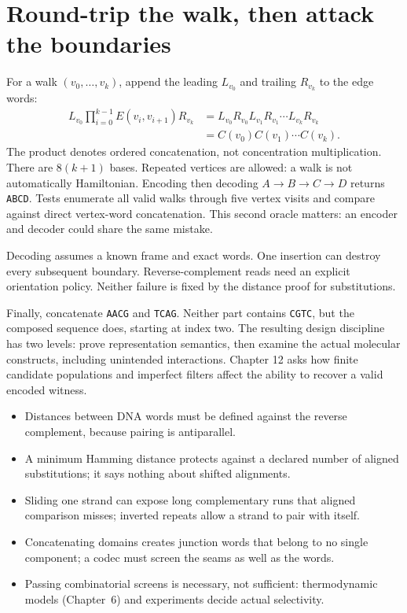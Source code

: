 \section{Round-trip the walk, then attack the boundaries}
For a walk $(v_0,\ldots,v_k)$, append the leading $L_{v_0}$ and trailing
$R_{v_k}$ to the edge words:
\begin{align}
 L_{v_0}\prod_{i=0}^{k-1}E(v_i,v_{i+1})R_{v_k}
 &=L_{v_0}R_{v_0}L_{v_1}R_{v_1}\cdots L_{v_k}R_{v_k}\\
 &=C(v_0)C(v_1)\cdots C(v_k).
\end{align}
The product denotes ordered concatenation, not concentration multiplication.
There are $8(k+1)$ bases. Repeated vertices are allowed: a walk is not
automatically Hamiltonian.
Encoding then decoding $A\to B\to C\to D$ returns \texttt{ABCD}.
Tests enumerate all valid walks through five vertex visits and compare
against direct vertex-word concatenation. This second oracle matters:
an encoder and decoder could share the same mistake.

Decoding assumes a known frame and exact words. One insertion can destroy
every subsequent boundary. Reverse-complement reads need an explicit
orientation policy. Neither failure is fixed by the distance proof for
substitutions.

Finally, concatenate \texttt{AACG} and \texttt{TCAG}. Neither part contains
\texttt{CGTC}, but the composed sequence does, starting at index two.
The resulting design discipline has two levels: prove representation semantics,
then examine the actual molecular constructs, including unintended interactions.
Chapter 12 asks how finite candidate populations and imperfect filters affect
the ability to recover a valid encoded witness.

\begin{KeyIdeas}
\begin{itemize}\setlength{\itemsep}{2pt}
\item Distances between DNA words must be defined against the reverse complement,
because pairing is antiparallel.
\item A minimum Hamming distance protects against a declared number of aligned
substitutions; it says nothing about shifted alignments.
\item Sliding one strand can expose long complementary runs that aligned
comparison misses; inverted repeats allow a strand to pair with itself.
\item Concatenating domains creates junction words that belong to no single
component; a codec must screen the seams as well as the words.
\item Passing combinatorial screens is necessary, not sufficient: thermodynamic
models (Chapter~6) and experiments decide actual selectivity.
\end{itemize}
\end{KeyIdeas}

